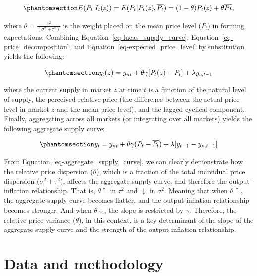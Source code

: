 \documentclass[
  letterpaper,
  DIV=11,
  numbers=noendperiod]{scrartcl}
\begin{document}
\begin{equation}\phantomsection\label{eq-expected_price_level}{ E(P_t| I_t(z))  = E(P_t|P_t(z), \overline{P_t}) = (1-\theta)P_t(z) + \theta\overline{Pt},}\end{equation}

where \(\theta = \frac{\tau^2}{(\sigma^2 + \tau^2)}\) is the weight
placed on the mean price level (\(\overline{P_t}\)) in forming
expectations. Combining Equation~\ref{eq-lucas_supply_curve},
Equation~\ref{eq-price_decomposition}, and
Equation~\ref{eq-expected_price_level} by substitution yields the
following:

\begin{equation}\phantomsection\label{eq-lucas_supply_curve_final}{ y_t(z) = y_{nt} + \theta \gamma[P_t(z) - \overline{P_t}] + \lambda y_{c, t-1}}\end{equation}

where the current supply in market \(z\) at time \(t\) is a function of
the natural level of supply, the perceived relative price (the
difference between the actual price level in market \(z\) and the mean
price level), and the lagged cyclical component. Finally, aggregating
across all markets (or integrating over all markets) yields the
following aggregate supply curve:

\begin{equation}\phantomsection\label{eq-aggregate_supply_curve}{y_t = y_{nt} + \theta\gamma(P_t - \overline{P_t}) + \lambda[y_{t-1} - y_{n, t-1}]}\end{equation}

From Equation~\ref{eq-aggregate_supply_curve}, we can clearly
demonstrate how the relative price dispersion (\(\theta\)), which is a
fraction of the total individual price dispersion
(\(\sigma^2 + \tau^2\)), affects the aggregate supply curve, and
therefore the output-inflation relationship. That is,
\(\theta \uparrow\) in \(\tau^2\) and \(\downarrow\) in \(\sigma^2\).
Meaning that when \(\theta \uparrow\), the aggregate supply curve
becomes flatter, and the output-inflation relationship becomes stronger.
And when \(\theta\downarrow\), the slope is restricted by \(\gamma\).
Therefore, the relative price variance (\(\theta\)), in this context, is
a key determinant of the slope of the aggregate supply curve and the
strength of the output-inflation relationship.

\section{Data and methodology}\label{data-and-methodology}
\end{document}
